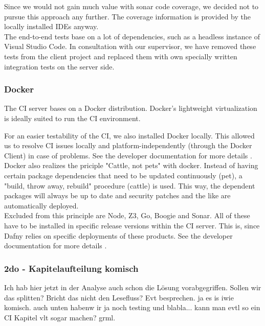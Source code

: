 Since we would not gain much value with sonar code coverage, we decided not to pursue this approach any further.
The coverage information is provided by the locally installed IDEs anyway.\\

The end-to-end tests base on a lot of dependencies, such as a headless instance of Visual Studio Code.
In consultation with our supervisor, we have removed these tests from the client project and replaced them with own specially written integration tests on the server side.

\subsubsection{Docker}
The CI server bases on a Docker distribution.
Docker's lightweight virtualization is ideally suited to run the CI environment.

For an easier testability of the CI, we also installed Docker locally.
This allowed us to resolve CI issues locally and platform-independently (through the Docker Client) in case of problems.
See the developer documentation for more details \cite{dev}.\\

Docker also realizes the priciple "Cattle, not pets" with docker.  
Instead of having certain package dependencies that need to be updated continuously (pet), a "build, throw away, rebuild" procedure (cattle) is used.
This way, the dependent packages will always be up to date and security patches and the like are automatically deployed.\\

Excluded from this principle are Node, Z3, Go, Boogie and Sonar.
All of these have to be installed in specific release versions within the CI server.
This is, since Dafny relies on specific deployments of these products. See the developer documentation for more details \cite{dev}. \\

\subsubsection{2do - Kapitelaufteilung komisch}
Ich hab hier jetzt in der Analyse auch schon die Lösung vorabgegriffen. Sollen wir das splitten? Bricht das nicht den Lesefluss? Evt besprechen.
ja es is iwie komisch. auch unten habenw ir ja noch testing und blabla... kann man evtl so ein CI Kapitel vlt sogar machen? grml.

